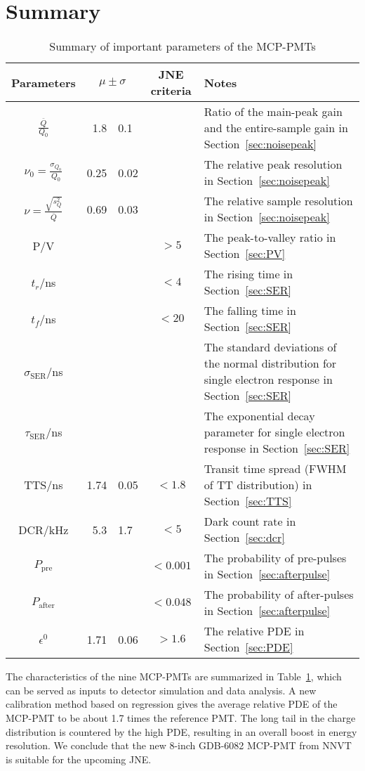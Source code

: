 \section{Summary}
\label{Summary}
\begin{table}
    \centering
    \caption{Summary of important parameters of the MCP-PMTs}
    \label{tab:summary}
    \begin{tabularx}{\textwidth}{c|r @{$\pm$} l |c|X}
        \hline
        Parameters&\multicolumn{2}{c}{$\mu\pm\sigma$}\vline&JNE criteria&Notes\\
        \hline
        $\frac{\overline{Q}}{Q_0}$&1.8&0.1&&Ratio of the main-peak gain and the entire-sample gain in Section~\ref{sec:noisepeak}\\
        $\nu_0=\frac{\sigma_{Q_0}}{Q_0}$&0.25&0.02&&The relative peak resolution in Section~\ref{sec:noisepeak}\\
        $\nu=\frac{\sqrt{s^2_{Q}}}{\overline{Q}}$&0.69&0.03&&The relative sample resolution in Section~\ref{sec:noisepeak}\\
        P/V&&&$>5$&The peak-to-valley ratio in Section~\ref{sec:PV}\\
        $t_r$/ns&&&$<4$&The rising time in Section~\ref{sec:SER}\\
        $t_f$/ns&&&$<20$&The falling time in Section~\ref{sec:SER}\\
        $\sigma_{\mathrm{SER}}$/ns&&&&The standard deviations of the normal distribution for single electron response in Section~\ref{sec:SER}\\
        $\tau_{\mathrm{SER}}$/ns&&&&The exponential decay parameter for single electron response in Section~\ref{sec:SER}\\
        TTS/ns&1.74&0.05&$<1.8$&Transit time spread (FWHM of TT distribution) in Section~\ref{sec:TTS}\\
        DCR/kHz&5.3&1.7&$<5$&Dark count rate in Section~\ref{sec:dcr}\\
        $P_{\mathrm{pre}}$&&&$<0.001$&The probability of pre-pulses in Section~\ref{sec:afterpulse}\\
        $P_{\mathrm{after}}$&&&$<0.048$&The probability of after-pulses in Section~\ref{sec:afterpulse}\\
        $\epsilon^0$&1.71&0.06&$>1.6$&The relative PDE in Section~\ref{sec:PDE}\\
        \hline
    \end{tabularx}
\end{table}

The characteristics of the nine MCP-PMTs are summarized in Table~\ref{tab:summary}, which can be served as inputs to detector simulation and data analysis. A new calibration method based on regression gives the average relative PDE of the MCP-PMT to be about 1.7 times the reference PMT. The long tail in the charge distribution is countered by the high PDE, resulting in an overall boost in energy resolution. We conclude that the new 8-inch GDB-6082 MCP-PMT from NNVT is suitable for the upcoming JNE.